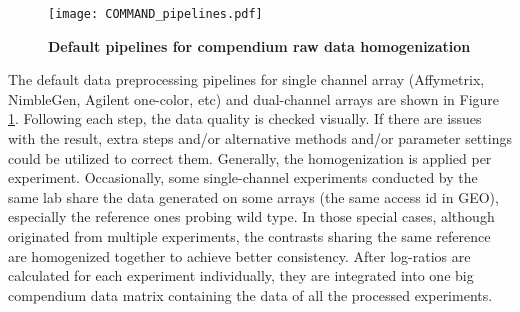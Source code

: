 \begin{figure}
  \centering
  \texttt{[image: COMMAND\_pipelines.pdf]}
  \caption[Default pipelines for compendium raw data homogenization]{
    \textbf{Default pipelines for compendium raw data homogenization}}
  \label{fig:command-pipelines}
\end{figure}
%

The default data preprocessing pipelines for single channel array (Affymetrix, 
NimbleGen, Agilent one-color, etc) and dual-channel arrays are shown in Figure 
\ref{fig:command-pipelines}.
%
%
Following each step, the data quality is checked visually.  If there are issues
with the result, extra steps and/or alternative methods and/or parameter
settings could be utilized to correct them.
%
%
Generally, the homogenization is applied per experiment.  
%
Occasionally, some single-channel experiments conducted by the same lab share
the data generated on some arrays (the same access id in GEO), especially the
reference ones probing wild type.
%
%
In those special cases, although originated from multiple experiments,
the contrasts sharing the same reference are homogenized together to
achieve better consistency.
%
After log-ratios are calculated for each experiment individually, they are
integrated into one big compendium data matrix containing the data of all the
processed experiments.


